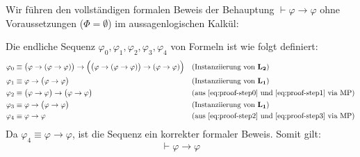 \begin{math-stroke}
Wir führen den vollständigen formalen Beweis der Behauptung $\vdash \varphi \rightarrow \varphi$ ohne Voraussetzungen ($\Phi = \emptyset$) im aussagenlogischen Kalkül:

\begin{short-proof}
Die endliche Sequenz $\varphi_0, \varphi_1, \varphi_2, \varphi_3, \varphi_4$ von Formeln ist wie folgt definiert:
\begin{align}
\varphi_0 &\equiv \bigl(\varphi \rightarrow (\varphi \rightarrow \varphi)\bigr) \rightarrow \Bigl(\bigl(\varphi \rightarrow (\varphi \rightarrow \varphi)\bigr) \rightarrow (\varphi \rightarrow \varphi)\Bigr) && \text{(Instanziierung von $\mathbf{L_2}$)} \label{eq:proof-step0} \\
\varphi_1 &\equiv \varphi \rightarrow \bigl(\varphi \rightarrow \varphi\bigr) && \text{(Instanziierung von $\mathbf{L_1}$)} \label{eq:proof-step1} \\
\varphi_2 &\equiv \bigl(\varphi \rightarrow \varphi\bigr) \rightarrow \bigl(\varphi \rightarrow \varphi\bigr) && \text{(aus \ref{eq:proof-step0} und \ref{eq:proof-step1} via $\text{MP}$)} \label{eq:proof-step2} \\
\varphi_3 &\equiv \varphi \rightarrow \bigl(\varphi \rightarrow \varphi\bigr) && \text{(Instanziierung von $\mathbf{L_1}$)} \label{eq:proof-step3} \\
\varphi_4 &\equiv \varphi \rightarrow \varphi && \text{(aus \ref{eq:proof-step2} und \ref{eq:proof-step3} via $\text{MP}$)} \label{eq:proof-step4}
\end{align}
Da $\varphi_4 \equiv \varphi \rightarrow \varphi$, ist die Sequenz ein korrekter formaler Beweis. Somit gilt:
\[ \vdash \varphi \rightarrow \varphi \]
\end{short-proof}
\end{math-stroke}

